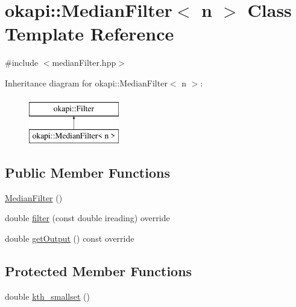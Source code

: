 \hypertarget{classokapi_1_1MedianFilter}{}\section{okapi\+::Median\+Filter$<$ n $>$ Class Template Reference}
\label{classokapi_1_1MedianFilter}


{\ttfamily \#include $<$median\+Filter.\+hpp$>$}

Inheritance diagram for okapi\+::Median\+Filter$<$ n $>$\+:\begin{figure}[H]
\begin{center}
\leavevmode
\includegraphics[height=2.000000cm]{classokapi_1_1MedianFilter}
\end{center}
\end{figure}
\subsection*{Public Member Functions}
\begin{DoxyCompactItemize}
\item 
\mbox{\hyperlink{classokapi_1_1MedianFilter_ab48a9a26745bf3ba81275c2857e63838}{Median\+Filter}} ()
\item 
double \mbox{\hyperlink{classokapi_1_1MedianFilter_a91e4104c4862082cd17ab92b43c02fab}{filter}} (const double ireading) override
\item 
double \mbox{\hyperlink{classokapi_1_1MedianFilter_ac38e6d04879eaeb98b853a24cb26e28c}{get\+Output}} () const override
\end{DoxyCompactItemize}
\subsection*{Protected Member Functions}
\begin{DoxyCompactItemize}
\item 
double \mbox{\hyperlink{classokapi_1_1MedianFilter_afe9b963e054b89cbdc13ea1acaaa900b}{kth\+\_\+smallset}} ()
\end{DoxyCompactItemize}
